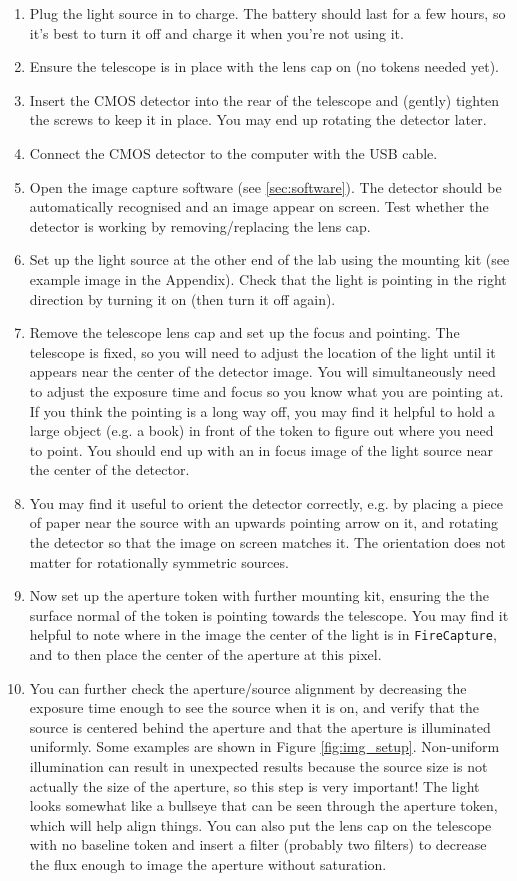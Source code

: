 \documentclass[11pt]{article}
\begin{document}
\begin{enumerate}
    \item Plug the light source in to charge. The battery should last for a few hours, so it's best to turn it off and charge it when you're not using it.
    \item Ensure the telescope is in place with the lens cap on (no tokens needed yet).
    \item Insert the CMOS detector into the rear of the telescope and (gently) tighten the screws to keep it in place. You may end up rotating the detector later.
    \item Connect the CMOS detector to the computer with the USB cable.
    \item Open the image capture software (see \ref{sec:software}). The detector should be automatically recognised and an image appear on screen. Test whether the detector is working by removing/replacing the lens cap.
    \item Set up the light source at the other end of the lab using the mounting kit (see example image in the Appendix). Check that the light is pointing in the right direction by turning it on (then turn it off again).
    \item Remove the telescope lens cap and set up the focus and pointing. The telescope is fixed, so you will need to adjust the location of the light until it appears near the center of the detector image. You will simultaneously need to adjust the exposure time and focus so you know what you are pointing at. If you think the pointing is a long way off, you may find it helpful to hold a large object (e.g. a book) in front of the token to figure out where you need to point. You should end up with an in focus image of the light source near the center of the detector.
    \item You may find it useful to orient the detector correctly, e.g. by placing a piece of paper near the source with an upwards pointing arrow on it, and rotating the detector so that the image on screen matches it. The orientation does not matter for rotationally symmetric sources.
    \item Now set up the aperture token with further mounting kit, ensuring the the surface normal of the token is pointing towards the telescope. You may find it helpful to note where in the image the center of the light is in \texttt{FireCapture}, and to then place the center of the aperture at this pixel.
    \item You can further check the aperture/source alignment by decreasing the exposure time enough to see the source when it is on, and verify that the source is centered behind the aperture and that the aperture is illuminated uniformly. Some examples are shown in Figure \ref{fig:img_setup}. Non-uniform illumination can result in unexpected results because the source size is not actually the size of the aperture, so this step is very important! The light looks somewhat like a bullseye that can be seen through the aperture token, which will help align things. You can also put the lens cap on the telescope with no baseline token and insert a filter (probably two filters) to decrease the flux enough to image the aperture without saturation.

\end{enumerate}
\end{document}
